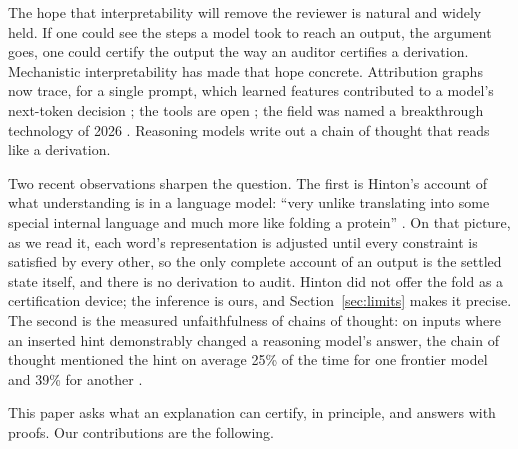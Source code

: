 \documentclass[11pt,letterpaper]{article}
\theoremstyle{plain}
\theoremstyle{definition}
\theoremstyle{remark}
\begin{document}
The hope that interpretability will remove the reviewer is natural and widely held. If one could see the steps a model took to reach an output, the argument goes, one could certify the output the way an auditor certifies a derivation. Mechanistic interpretability has made that hope concrete. Attribution graphs now trace, for a single prompt, which learned features contributed to a model's next-token decision \citep{ameisen2025circuit,lindsey2025biology}; the tools are open \citep{anthropic2025opensource}; the field was named a breakthrough technology of 2026 \citep{mittechreview2026}. Reasoning models write out a chain of thought that reads like a derivation.

Two recent observations sharpen the question. The first is Hinton's account of what understanding is in a language model: ``very unlike translating into some special internal language and much more like folding a protein'' \citep{hinton2026vienna}. On that picture, as we read it, each word's representation is adjusted until every constraint is satisfied by every other, so the only complete account of an output is the settled state itself, and there is no derivation to audit. Hinton did not offer the fold as a certification device; the inference is ours, and Section~\ref{sec:limits} makes it precise. The second is the measured unfaithfulness of chains of thought: on inputs where an inserted hint demonstrably changed a reasoning model's answer, the chain of thought mentioned the hint on average 25\% of the time for one frontier model and 39\% for another \citep{chen2025reasoning}.

This paper asks what an explanation can certify, in principle, and answers with proofs. Our contributions are the following.
\end{document}
